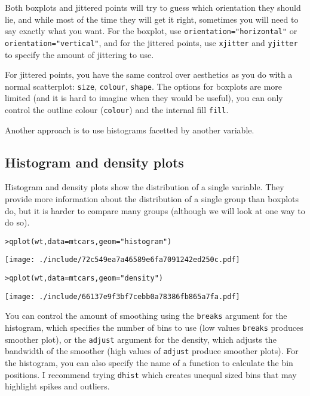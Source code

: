 Both boxplots and jittered points will try to guess which orientation they should lie, and while most of the time they will get it right, sometimes you will need to say exactly what you want.  For the boxplot, use {\tt orientation="horizontal"} or {\tt orientation="vertical"}, and for the jittered points, use {\tt xjitter} and {\tt yjitter} to specify the amount of jittering to use. 

For jittered points, you have the same control over aesthetics as you do with a normal scatterplot: {\tt size}, {\tt colour}, {\tt shape}.  The options for boxplots are more limited (and it is hard to imagine when they would be useful), you can only control the outline colour ({\tt colour}) and the internal fill {\tt fill}.

Another approach is to use histograms facetted by another variable.

\subsection{Histogram and density plots}\label{sub:density}

Histogram and density plots show the distribution of a single variable.  They provide more information about the distribution of a single group than boxplots do, but it is harder to compare many groups (although we will look at one way to do so).

\begin{alltt}
> qplot(wt, data = mtcars, geom = "histogram")
\end{alltt}
\texttt{[image: ./include/72c549ea7a46589e6fa7091242ed250c.pdf]}
\begin{alltt}

> qplot(wt, data = mtcars, geom = "density")
\end{alltt}
\texttt{[image: ./include/66137e9f3bf7cebb0a78386fb865a7fa.pdf]}
\begin{alltt}

\end{alltt}

You can control the amount of smoothing using the {\tt breaks} argument for the histogram, which specifies the number of bins to use (low values {\tt breaks} produces smoother plot), or the {\tt adjust} argument for the density, which adjusts the bandwidth of the smoother (high values of {\tt adjust} produce smoother plots).  For the histogram, you can also specify the name of a function to calculate the bin positions.  I recommend trying {\tt dhist} which creates unequal sized bins that may highlight spikes and outliers.

